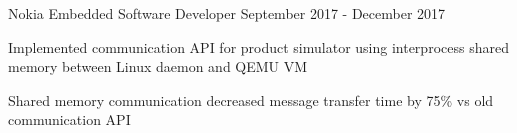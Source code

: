 \begin{cventries}
  \cventry
    {Nokia} %
    {Embedded Software Developer} %
    {September 2017 - December 2017} %
    {}
    {
      \begin{cvitems} %
        \item {Implemented communication API for product simulator using interprocess shared memory between Linux daemon and QEMU VM}
        \item {Shared memory communication decreased message transfer time by 75\% vs old communication API}
      \end{cvitems}
    }



\end{cventries}
